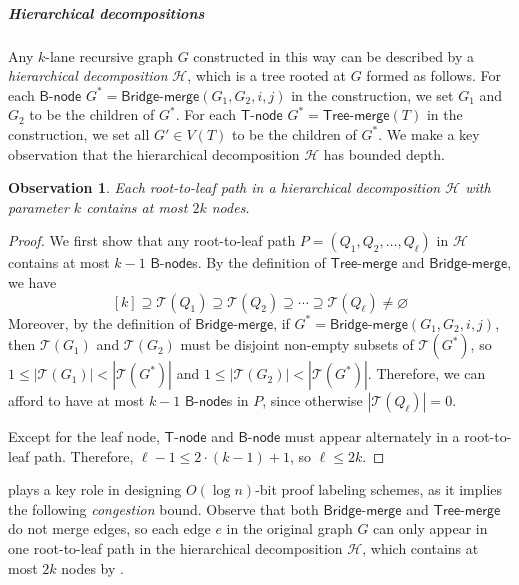 \documentclass[11pt]{article}
\newtheorem{observation}[lemma]{Observation}
\theoremstyle{definition}
\newtheorem{definition}[lemma]{Definition}
\theoremstyle{remark}
\renewcommand{\emptyset}{\varnothing}
\newcommand{\tmerge}{\mathsf{Tree}\text{-}\mathsf{merge}}
\newcommand{\bmerge}{\mathsf{Bridge}\text{-}\mathsf{merge}}
\newcommand{\bnode}{\mathsf{B}\text{-}\mathsf{node}}
\newcommand{\tnode}{\mathsf{T}\text{-}\mathsf{node}}
\begin{document}

\subparagraph{Hierarchical decompositions} Any $k$-lane recursive graph $G$ constructed in this way can be described by a \emph{hierarchical decomposition} $\mathcal{H}$, which is a tree rooted at $G$ formed as follows. For each $\bnode$ $G^\ast = \bmerge(G_1,G_2,i,j)$ in the construction, we set $G_1$ and $G_2$ to be the children of $G^\ast$. For each $\tnode$  $G^\ast = \tmerge(T)$ in the construction, we set all $G' \in V(T)$ to be the children of $G^\ast$. We make a key observation that the hierarchical decomposition $\mathcal{H}$ has bounded depth.

\begin{observation}\label{obs:tree_depth}
Each root-to-leaf path in a hierarchical decomposition $\mathcal{H}$ with parameter $k$ contains at most $2k$ nodes.
\end{observation}
\begin{proof}
We first show that any root-to-leaf path $P = (Q_1, Q_2, \ldots, Q_\ell)$ in $\mathcal{H}$ contains at most $k-1$ $\bnode$s. By the definition of $\tmerge$ and $\bmerge$, we have \[[k] \supseteq \mathcal{T}(Q_1) \supseteq \mathcal{T}(Q_2) \supseteq \cdots \supseteq  \mathcal{T}(Q_\ell) \neq \emptyset \]
Moreover, by the definition of $\bmerge$, if $G^\ast = \bmerge(G_1,G_2,i,j)$, then $\mathcal{T}(G_1)$ and $\mathcal{T}(G_2)$ must be disjoint non-empty subsets of $\mathcal{T}(G^\ast)$, so $1 \leq |\mathcal{T}(G_1)| < |\mathcal{T}(G^\ast)|$ and $1 \leq |\mathcal{T}(G_2)| < |\mathcal{T}(G^\ast)|$. Therefore, we can afford to have at most $k-1$ $\bnode$s in $P$, since otherwise $|\mathcal{T}(Q_\ell)| = 0$.

Except for the leaf node, $\tnode$ and $\bnode$ must appear alternately in a root-to-leaf path. Therefore, $\ell-1 \leq 2\cdot(k-1)+1$, so $\ell \leq 2k$.
\end{proof}

 plays a key role in designing $O(\log n)$-bit proof labeling schemes, as it implies the following \emph{congestion} bound. Observe that both $\bmerge$ and $\tmerge$ do not merge edges, so each edge $e$ in the original graph $G$ can only appear in one root-to-leaf path in the hierarchical decomposition $\mathcal{H}$, which contains at most $2k$ nodes by . 
\end{document}
